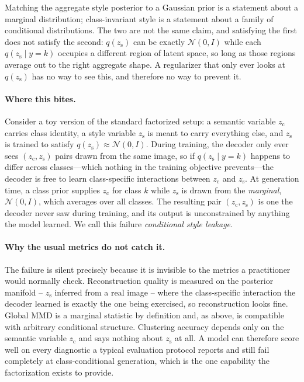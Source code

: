 \documentclass[10pt,letterpaper]{article}
\newcommand{\zc}{z_{\mathrm{c}}}
\newcommand{\zs}{z_{\mathrm{s}}}
\begin{document}
Matching the aggregate style posterior to a Gaussian prior is a statement
about a marginal distribution; class-invariant style is a statement about a
family of conditional distributions. The two are not the same claim, and
satisfying the first does not satisfy the second: $q(\zs)$ can be exactly
$\mathcal N(0,I)$ while each $q(\zs\mid y{=}k)$ occupies a different region
of latent space, so long as those regions average out to the right
aggregate shape. A regularizer that only ever looks at $q(\zs)$ has no way
to see this, and therefore no way to prevent it.

\paragraph{Where this bites.}
Consider a toy version of the standard factorized setup: a semantic
variable $\zc$ carries class identity, a style variable $\zs$ is meant to
carry everything else, and $\zs$ is trained to satisfy
$q(\zs)\approx\mathcal N(0,I)$. During training, the decoder only ever sees
$(\zc,\zs)$ pairs drawn from the same image, so if $q(\zs\mid y{=}k)$
happens to differ across classes---which nothing in the training objective
prevents---the decoder is free to learn class-specific interactions between
$\zc$ and $\zs$. At generation time, a class prior supplies $\zc$ for class
$k$ while $\zs$ is drawn from the \emph{marginal}, $\mathcal N(0,I)$, which
averages over all classes. The resulting pair $(\zc,\zs)$ is one the decoder
never saw during training, and its output is unconstrained by anything the
model learned. We call this failure \emph{conditional style leakage}.

\paragraph{Why the usual metrics do not catch it.}
The failure is silent precisely because it is invisible to the metrics a
practitioner would normally check. Reconstruction quality is measured on
the posterior manifold -- $\zs$ inferred from a real image -- where the
class-specific interaction the decoder learned is exactly the one being
exercised, so reconstruction looks fine. Global MMD is a marginal statistic
by definition and, as above, is compatible with arbitrary conditional
structure. Clustering accuracy depends only on the semantic variable $\zc$
and says nothing about $\zs$ at all. A model can therefore score well on
every diagnostic a typical evaluation protocol reports and still fail
completely at class-conditional generation, which is the one capability the
factorization exists to provide.
\end{document}
